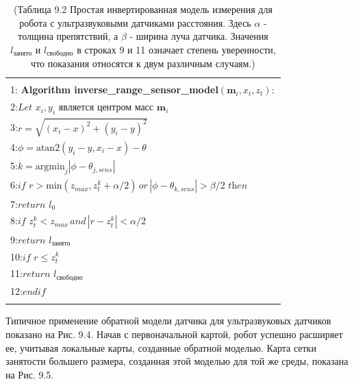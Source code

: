 \documentclass[10pt,a4paper]{article}
\begin{document}
\begin{table}[H]
\begin{center}
\begin{tabular}{|l|}
\hline
{}\\
1: \textbf{Algorithm inverse\_range\_sensor\_model}$(\textbf{m}_i,x_t,z_t):$ \\
2:\hspace{5mm}$\textit{Let}\,\,x_i,y_i\,\,\textit{является центром масс}\,\,\textbf{m}_i$\\
3:\hspace{5mm}$r=\sqrt{(x_i-x)^2+(y_i-y)^2}$\\
4:\hspace{5mm}$\phi=\text{atan}2(y_i-y,x_i-x)-\theta$\\
5:\hspace{5mm}$k=\text{argmin}_j|\phi-\theta_{j,sens}|$\\
6:\hspace{5mm}$\textit{if}\,\,r>\text{min}(z_{max},z_t^k+\alpha/2)\,\textit{or}\,|\phi-\theta_{k,sens}|>\beta/2\,\,\textit{then}$\\
7:\hspace{10mm}$\textit{return}\,\,l_0$\\
8:\hspace{5mm}$\textit{if}\,\,z_t^k<z_{max}\,\textit{and}\,|r-z_t^k|<\alpha/2$\\
9:\hspace{10mm}$\textit{return}\,\,l_{\textit{занято}}$\\
10:\hspace{4mm}$\textit{if}\,\,r\leq z_t^k$\\
11:\hspace{9mm}$\textit{return}\,\,l_{\textit{свободно}}$\\
12:\hspace{4mm}$\textit{endif}$\\
{}\\
\hline
\end{tabular}
\caption{(Таблица 9.2 Простая инвертированная модель измерения для робота с ультразвуковыми датчиками расстояния. Здесь $\alpha$ - толщина препятствий, а $\beta$ - ширина луча датчика. Значения $l_{\textit{занято}}$ и $l_{\textit{свободно}}$ в строках 9 и 11 означает степень уверенности, что показания относятся к двум различным случаям.)}
\end{center}
\end{table}

Типичное применение обратной модели датчика для ультразвуковых датчиков показано на Рис. 9.4. Начав с первоначальной картой, робот успешно расширяет ее, учитывая локальные карты, созданные обратной моделью. Карта сетки занятости большего размера, созданная этой моделью для той же среды, показана на Рис. 9.5.
\end{document}
